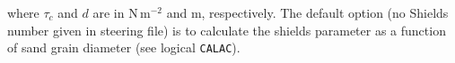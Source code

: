
where $\tau_c$ and $d$ are in N\,m$^{-2}$ and m, respectively. The default option (no Shields number given in steering file) is to calculate the shields parameter as a function of 
sand grain diameter (see logical \texttt{CALAC}).






